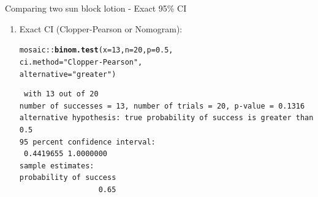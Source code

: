 \documentclass[handout]{beamer}\usepackage[]{graphicx}\usepackage[]{color}
\newcommand{\hlnum}[1]{\textcolor[rgb]{0.686,0.059,0.569}{#1}}%
\newcommand{\hlstr}[1]{\textcolor[rgb]{0.192,0.494,0.8}{#1}}%
\newcommand{\hlopt}[1]{\textcolor[rgb]{0,0,0}{#1}}%
\newcommand{\hlstd}[1]{\textcolor[rgb]{0.345,0.345,0.345}{#1}}%
\newcommand{\hlkwc}[1]{\textcolor[rgb]{0.333,0.667,0.333}{#1}}%
\newcommand{\hlkwd}[1]{\textcolor[rgb]{0.737,0.353,0.396}{\textbf{#1}}}%
\newenvironment{knitrout}{}{} %
\begin{document}
\begin{frame}[fragile]{Comparing two sun block lotion - Exact 95\% CI}
\small
\begin{enumerate}
	\setlength\itemsep{1em}
	
	\item Exact CI (Clopper-Pearson or Nomogram):
\begin{knitrout}\scriptsize
{}\color{fgcolor}
\begin{alltt}
\hlstd{mosaic}\hlopt{::}\hlkwd{binom.test}\hlstd{(}\hlkwc{x} \hlstd{=} \hlnum{13}\hlstd{,} \hlkwc{n} \hlstd{=} \hlnum{20}\hlstd{,} \hlkwc{p} \hlstd{=} \hlnum{0.5}\hlstd{,}
\hlkwc{ci.method} \hlstd{=} \hlstr{"Clopper-Pearson"}\hlstd{,}
\hlkwc{alternative} \hlstd{=} \hlstr{"greater"}\hlstd{)}
\end{alltt}
\begin{verbatim}
 with 13 out of 20 
number of successes = 13, number of trials = 20, p-value = 0.1316
alternative hypothesis: true probability of success is greater than 0.5 
95 percent confidence interval:
 0.4419655 1.0000000 
sample estimates:
probability of success 
                  0.65 
\end{verbatim}

\end{knitrout}
	

	
\end{enumerate}

\end{frame}
\end{document}
